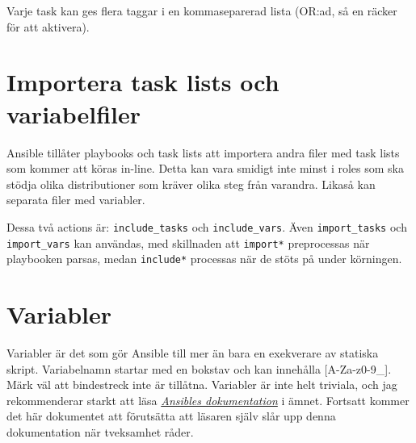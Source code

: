 Varje task kan ges flera taggar i en kommaseparerad lista (OR:ad, så en räcker för att aktivera).

\section{Importera task lists och variabelfiler}
Ansible tillåter playbooks och task lists att importera andra filer med task lists som kommer att köras in-line. Detta kan
vara smidigt inte minst i roles som ska stödja olika distributioner som kräver olika steg från varandra. Likaså
kan separata filer med variabler.

Dessa två actions är:
\texttt{include\_tasks} och \texttt{include\_vars}. Även \texttt{import\_tasks} och \texttt{import\_vars} kan
användas, med skillnaden att \texttt{import*} preprocessas när playbooken parsas, medan \texttt{include*} processas
när de stöts på under körningen.

\section{Variabler}
Variabler är det som gör Ansible till mer än bara en exekverare av statiska skript.
Variabelnamn startar med en bokstav och kan innehålla [A-Za-z0-9\_]. Märk väl att bindestreck inte är tillåtna.
Variabler är inte helt triviala, och jag rekommenderar starkt att läsa \href{https://docs.ansible.com/ansible/2.6/user_guide/playbooks_variables.html}{\em Ansibles dokumentation} i ämnet. Fortsatt kommer det här dokumentet att förutsätta att läsaren själv slår upp denna dokumentation när tveksamhet råder.
